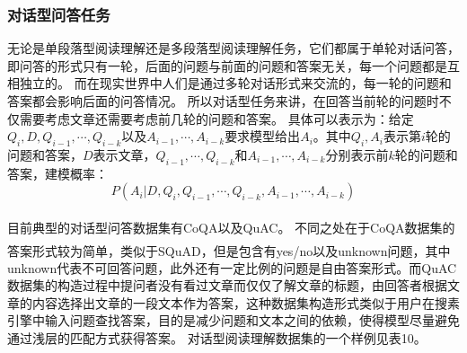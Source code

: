 \documentclass{article}
\newcommand{\upcite}[1]{\textsuperscript{\textsuperscript{\cite{#1}}}}
\begin{document}
\subsubsection{对话型问答任务}\label{cmrc}
%
%
无论是单段落型阅读理解还是多段落型阅读理解任务，它们都属于单轮对话问答，即问答的形式只有一轮，后面的问题与前面的问题和答案无关，每一个问题都是互相独立的。
而在现实世界中人们是通过多轮对话形式来交流的，每一轮的问题和答案都会影响后面的问答情况。
所以对话型任务来讲，在回答当前轮的问题时不仅需要考虑文章还需要考虑前几轮的问题和答案。
具体可以表示为：给定$Q_i,D,Q_{i-1},\cdots,Q_{i-k}$以及$A_{i-1},\cdots,A_{i-k}$要求模型给出$A_{i}$。其中$Q_i,A_i$表示第$i$轮的问题和答案，$D$表示文章，$Q_{i-1},\cdots,Q_{i-k}$和$A_{i-1},\cdots,A_{i-k}$分别表示前$k$轮的问题和答案，建模概率：
\begin{equation}
P(A_i|D,Q_i,Q_{i-1},\cdots,Q_{i-k},A_{i-1},\cdots,A_{i-k})
\end{equation}

目前典型的对话型问答数据集有CoQA\upcite{CoQA}以及QuAC\upcite{QuAC}。
不同之处在于CoQA数据集的答案形式较为简单，类似于SQuAD\upcite{SQuAD1}，但是包含有yes/no以及unknown问题，其中unknown代表不可回答问题，此外还有一定比例的问题是自由答案形式。而QuAC数据集的构造过程中提问者没有看过文章而仅仅了解文章的标题，由回答者根据文章的内容选择出文章的一段文本作为答案，这种数据集构造形式类似于用户在搜素引擎中输入问题查找答案，目的是减少问题和文本之间的依赖，使得模型尽量避免通过浅层的匹配方式获得答案。
对话型阅读理解数据集的一个样例见表10。
\end{document}
